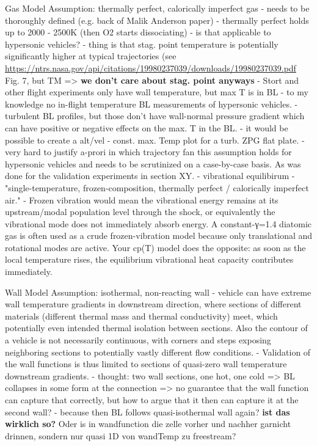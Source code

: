 Gas Model Assumption: thermally perfect, calorically imperfect gas
- needs to be thoroughly defined (e.g. back of Malik Anderson paper)
- thermally perfect holds up to 2000 - 2500K (then O2 starts dissociating)
    - is that applicable to hypersonic vehicles?
    - thing is that stag. point temperature is potentially significantly higher at typical trajectories (see \url{https://ntrs.nasa.gov/api/citations/19980237039/downloads/19980237039.pdf} Fig. 7, but TM => \textbf{we don't care about stag. point anyways}
    - Stort and other flight experiments only have wall temperature, but max T is in BL
        - to my knowledge no in-flight temperature BL measurements of hypersonic vehicles.
    - turbulent BL profiles, but those don't have wall-normal pressure gradient which can have positive or negative effects on the max. T in the BL.
        - it would be possible to create a alt/vel - const. max. Temp plot for a turb. ZPG flat plate.
    - very hard to justify a-prori in which trajectory fan this assumption holds for hypersonic vehicles and needs to be scrutinized on a case-by-case basis. As was done for the validation experiments in section XY.
    - vibrational equilibirum
        - "single-temperature, frozen-composition, thermally perfect / calorically imperfect air."
        - Frozen vibration would mean the vibrational energy remains at its upstream/modal population level through the shock, or equivalently the vibrational mode does not immediately absorb energy. A constant-γ=1.4 diatomic gas is often used as a crude frozen-vibration model because only translational and rotational modes are active. Your cp(T) model does the opposite: as soon as the local temperature rises, the equilibrium vibrational heat capacity contributes immediately.


Wall Model Assumption: isothermal, non-reacting wall
    - vehicle can have extreme wall temperature gradients in downstream direction, where sections of different materials (different thermal mass and thermal conductivity) meet, which potentially even intended thermal isolation between sections. Also the contour of a vehicle is not necessarily continuous, with corners and steps exposing neighboring sections to potentially vastly different flow conditions.
    - Validation of the wall functions is thus limited to sections of quasi-zero wall temperature downstream gradients.
        - thought: two wall sections, one hot, one cold => BL collapses in some form at the connection => no guarantee that the wall function can capture that correctly, but how to argue that it then can capture it at the second wall? - because then BL follows quasi-isothermal wall again?
    \textbf{ist das wirklich so?} Oder is in wandfunction die zelle vorher und nachher garnicht drinnen, sondern nur quasi 1D von wandTemp zu freestream?